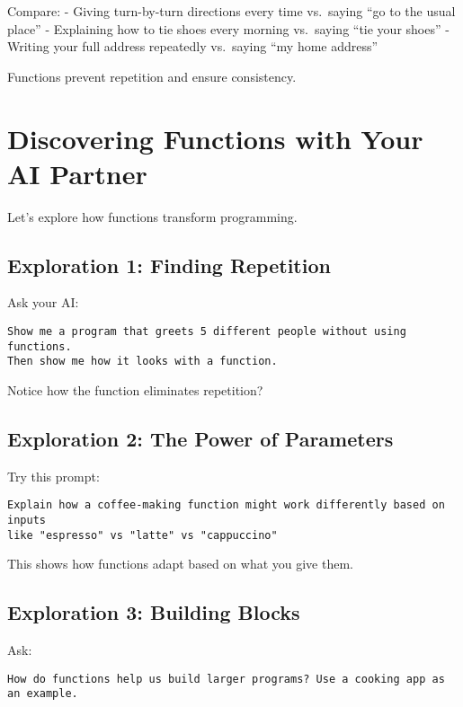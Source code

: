 \documentclass[
  letterpaper,
  DIV=11,
  numbers=noendperiod,
  oneside]{scrreprt}
\begin{document}
Compare: - Giving turn-by-turn directions every time vs.~saying ``go to
the usual place'' - Explaining how to tie shoes every morning vs.~saying
``tie your shoes'' - Writing your full address repeatedly vs.~saying
``my home address''

Functions prevent repetition and ensure consistency.

\section{Discovering Functions with Your AI
Partner}\label{discovering-functions-with-your-ai-partner}

Let's explore how functions transform programming.

\subsection{Exploration 1: Finding
Repetition}\label{exploration-1-finding-repetition-1}

Ask your AI:

\begin{verbatim}
Show me a program that greets 5 different people without using functions. 
Then show me how it looks with a function.
\end{verbatim}

Notice how the function eliminates repetition?

\subsection{Exploration 2: The Power of
Parameters}\label{exploration-2-the-power-of-parameters}

Try this prompt:

\begin{verbatim}
Explain how a coffee-making function might work differently based on inputs 
like "espresso" vs "latte" vs "cappuccino"
\end{verbatim}

This shows how functions adapt based on what you give them.

\subsection{Exploration 3: Building
Blocks}\label{exploration-3-building-blocks}

Ask:

\begin{verbatim}
How do functions help us build larger programs? Use a cooking app as an example.
\end{verbatim}
\end{document}
